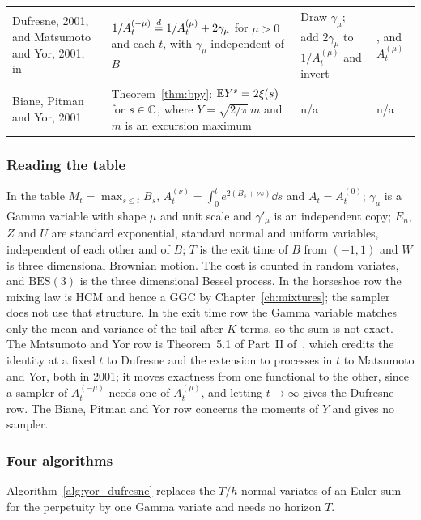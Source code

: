 \begin{table}[t]
\begin{tabular}{@{}>{\raggedright\arraybackslash}p{0.95in}>{\raggedright\arraybackslash}p{1.85in}>{\raggedright\arraybackslash}p{1.15in}>{\raggedright\arraybackslash}p{0.34in}@{}}
Dufresne, 2001, and Matsumoto and Yor, 2001, in~\cite{matsumotoyor2005} & $1/A^{(-\mu)}_t\stackrel{d}{=} 1/A^{(\mu)}_t+2\gamma_\mu$ for $\mu>0$ and each $t$, with $\gamma_\mu$ independent of $B$ & Draw $\gamma_\mu$; add $2\gamma_\mu$ to $1/A^{(\mu)}_t$ and invert & 1, and $A^{(\mu)}_t$\\
Biane, Pitman and Yor, 2001~\cite{bpy2001} & Theorem~\ref{thm:bpy}: $\mathbb{E} Y^s=2\xi(s)$ for $s\in\mathbb{C}$, where $Y=\sqrt{2/\pi}\,m$ and $m$ is an excursion maximum & n/a & n/a\\
\bottomrule
\end{tabular}
\end{table}

\subsubsection{Reading the table} In the table $M_t=\max_{s\le t}B_s$, $A^{(\nu)}_t=\int_0^te^{2(B_s+\nu s)}\dd s$ and $A_t=A^{(0)}_t$; $\gamma_\mu$ is a Gamma variable with shape $\mu$ and unit scale and $\gamma'_\mu$ is an independent copy; $E_n$, $Z$ and $U$ are standard exponential, standard normal and uniform variables, independent of each other and of $B$; $T$ is the exit time of $B$ from $(-1,1)$ and $W$ is three dimensional Brownian motion. The cost is counted in random variates, and $\mathrm{BES}(3)$ is the three dimensional Bessel process. In the horseshoe row the mixing law is HCM and hence a GGC by Chapter~\ref{ch:mixtures}; the sampler does not use that structure. In the exit time row the Gamma variable matches only the mean and variance of the tail after $K$ terms, so the sum is not exact. The Matsumoto and Yor row is Theorem~5.1 of Part~II of~\cite{matsumotoyor2005}, which credits the identity at a fixed $t$ to Dufresne and the extension to processes in $t$ to Matsumoto and Yor, both in 2001; it moves exactness from one functional to the other, since a sampler of $A^{(-\mu)}_t$ needs one of $A^{(\mu)}_t$, and letting $t\to\infty$ gives the Dufresne row. The Biane, Pitman and Yor row concerns the moments of $Y$ and gives no sampler.

\subsubsection{Four algorithms} Algorithm~\ref{alg:yor_dufresne} replaces the $T/h$ normal variates of an Euler sum for the perpetuity by one Gamma variate and needs no horizon $T$.

